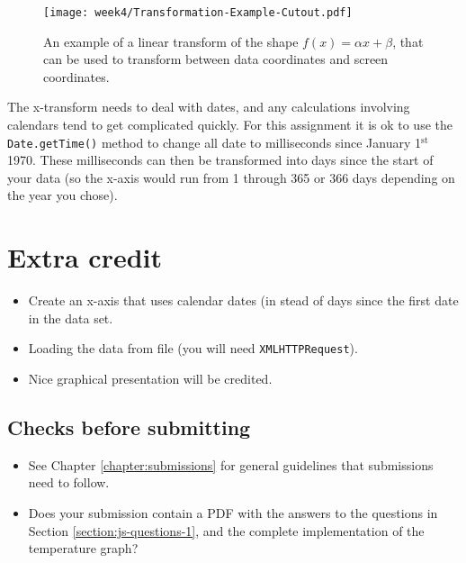 \begin{figure}
\centering
\texttt{[image: week4/Transformation-Example-Cutout.pdf]}
\caption{An example of a linear transform of the shape $f(x) = \alpha x + \beta$,
that can be used to transform between data coordinates and screen coordinates.}
\label{fig:transformation}
\end{figure}

The x-transform needs to deal with dates, and any calculations involving
calendars tend to get complicated quickly. For this assignment it is ok
to use the \mbox{\texttt{Date.getTime()}} method to change all date
to milliseconds since January 1$^\mathrm{st}$ 1970. These milliseconds can
then be transformed into days since the start of your data (so the x-axis
would run from 1 through 365 or 366 days depending on the year you chose).

\section{Extra credit}
\begin{itemize}
    \item Create an x-axis that uses calendar dates (in stead of days since
          the first date in the data set.
    \item Loading the data from file (you will need \texttt{XMLHTTPRequest}).
    \item Nice graphical presentation will be credited.
\end{itemize}


\subsection{Checks before submitting}
\begin{itemize}
    \item See Chapter \ref{chapter:submissions} for general guidelines that
          submissions need to follow.
    \item Does your submission contain a PDF with the answers to the 
          questions in Section \ref{section:js-questions-1}, and the complete
          implementation of the temperature graph?
\end{itemize}
